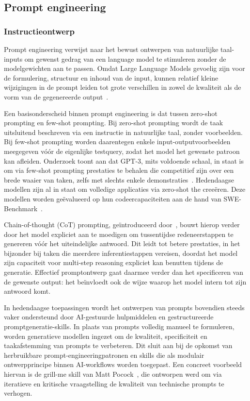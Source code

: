 \subsection{Prompt engineering}\label{subsec:prompt}

\subsubsection{Instructieontwerp}
Prompt engineering verwijst naar het bewust ontwerpen van natuurlijke taal-inputs om gewenst gedrag van een language model te stimuleren zonder de modelgewichten aan te passen. Omdat Large Language Models gevoelig zijn voor de formulering, structuur en inhoud van de input, kunnen relatief kleine wijzigingen in de prompt leiden tot grote verschillen in zowel de kwaliteit als de vorm van de gegenereerde output~\cite{brown2020gpt3}.

Een basisonderscheid binnen prompt engineering is dat tussen zero-shot prompting en few-shot prompting. Bij zero-shot prompting wordt de taak uitsluitend beschreven via een instructie in natuurlijke taal, zonder voorbeelden. Bij few-shot prompting worden daarentegen enkele input-outputvoorbeelden meegegeven vóór de eigenlijke testquery, zodat het model het gewenste patroon kan afleiden. Onderzoek toont aan dat GPT-3, mits voldoende schaal, in staat is om via few-shot prompting prestaties te behalen die competitief zijn over een brede waaier van taken, zelfs met slechts enkele demonstraties~\cite{brown2020gpt3}. Hedendaagse modellen zijn al in staat om volledige applicaties via zero-shot the creeëren. Deze modellen worden geëvalueerd op hun codeercapaciteiten aan de hand van SWE-Benchmark~\cite{scale_swebench_pro}.

Chain-of-thought (CoT) prompting, geïntroduceerd door~\cite{wei2022cot}, bouwt hierop verder door het model expliciet aan te moedigen om tussentijdse redeneerstappen te genereren vóór het uiteindelijke antwoord. Dit leidt tot betere prestaties, in het bijzonder bij taken die meerdere inferentiestappen vereisen, doordat het model zijn capaciteit voor multi-step reasoning expliciet kan benutten tijdens de generatie. Effectief promptontwerp gaat daarmee verder dan het specificeren van de gewenste output: het beïnvloedt ook de wijze waarop het model intern tot zijn antwoord komt.

In hedendaagse toepassingen wordt het ontwerpen van prompts bovendien steeds vaker ondersteund door AI-gestuurde hulpmiddelen en gestructureerde promptgeneratie-skills. In plaats van prompts volledig manueel te formuleren, worden generatieve modellen ingezet om de kwaliteit, specificiteit en taakafstemming van prompts te verbeteren. Dit sluit aan bij de opkomst van herbruikbare prompt-engineeringpatronen en skills die als modulair ontwerpprincipe binnen AI-workflows worden toegepast. Een concreet voorbeeld hiervan is de grill-me skill van Matt Pocock~\cite{Pocock2025GrillMeSkill}, die ontworpen werd om via iteratieve en kritische vraagstelling de kwaliteit van technische prompts te verhogen.

